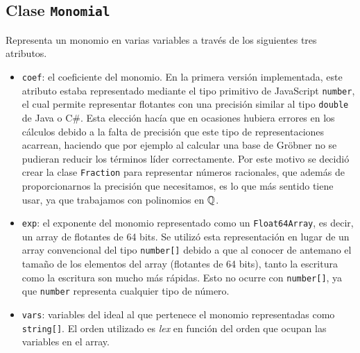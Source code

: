 \subsection{Clase \texttt{Monomial}}
Representa un monomio en varias variables a través de los siguientes tres atributos.
\begin{itemize}
    \item \texttt{coef}: el coeficiente del monomio. En la primera versión implementada, este atributo estaba representado mediante el tipo primitivo de JavaScript \texttt{number}, el cual permite representar flotantes con una precisión similar al tipo \texttt{double} de Java o C\#. Esta elección hacía que en ocasiones hubiera errores en los cálculos debido a la falta de precisión que este tipo de representaciones acarrean, haciendo que por ejemplo al calcular una base de Gröbner no se pudieran reducir los términos líder correctamente. Por este motivo se decidió crear la clase \texttt{Fraction} para representar números racionales, que además de proporcionarnos la precisión que necesitamos, es lo que más sentido tiene usar, ya que trabajamos con polinomios en $\mathbb{Q}$. 
    \item \texttt{exp}: el exponente del monomio representado como un \texttt{Float64Array}, es decir, un array de flotantes de 64 bits. Se utilizó esta representación en lugar de un array convencional del tipo \texttt{number[]} debido a que al conocer de antemano el tamaño de los elementos del array (flotantes de 64 bits), tanto la escritura como la escritura son mucho más rápidas. Esto no ocurre con \texttt{number[]}, ya que \texttt{number} representa cualquier tipo de número.
    \item \texttt{vars}: variables del ideal al que pertenece el monomio representadas como \texttt{string[]}. El orden utilizado es \textit{lex} en función del orden que  ocupan las variables en el array.
\end{itemize}

